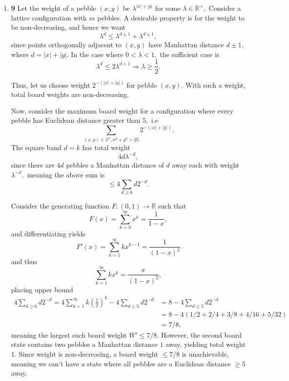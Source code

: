 \documentclass[12pt]{article}
\begin{document}
\begin{enumerate}
    Reversing this process will allow us to produce any arbitrary
    board configuration where all axis parallel rectangles have
    corner product $1$ starting from the board with all $1$'s.

  \item \textbf{9} Let the weight of a pebble $(x, y)$ be
    $\lambda^{|x| + |y|}$ for some $\lambda \in \mathbb R^{+},$
    Consider a lattice configuration with $m$ pebbles. A desirable
    property is for the weight to be non-decreasing, and hence we want
    $$
    \lambda^{d} \leq \lambda^{d \pm 1} + \lambda^{ d \pm 1},
    $$
    since points orthogonally adjacent to $(x, y)$ have Manhattan
    distance $d \pm 1,$ where $d = |x| + |y|.$ In the case where $0 <
    \lambda < 1,$ the sufficient case is
    $$
    \lambda^d \leq 2 \lambda ^{d+1} \Rightarrow \lambda \geq  \frac{1}{2}.
    $$

    Thus, let us choose weight $2^{-(|x| + |y|)}$ for pebble $(x,
    y).$ With such a weight, total board weights are non-decreasing.

    Now, consider the maximum board weight for a configuration where
    every pebble has Euclidean distance greater than $5,$ i.e
    $$
    \sum_{(x, y) \in \mathbb Z^{2}, x^2 + y^2 > 25} 2^{-(|x| + |y|)}.
    $$
    The square band $d = k$ has total weight
    $$
    4d\lambda^{-d} ,
    $$
    since there are $4d$ pebbles a Manhattan distance of $d$ away
    each with weight $\lambda^{-d},$ meaning the above sum is
    $$
    \leq 4\sum_{d \geq 6} d 2^{-d}.
    $$

    Consider the generating function $F : (0, 1) \to \mathbb R$ such that $$
    F(x) = \sum_{k = 0}^{\infty} x^{k} = \dfrac{1}{1-x},
    $$
    and differentiating yields
    $$
    F'(x)  = \sum_{k = 1}^{\infty} kx^{k-1} = \dfrac{1}{(1-x)^2}
    $$
    and thus
    $$
    \sum_{k = 1}^{\infty} kx^{k} = \dfrac{x}{(1-x)^2},
    $$
    placing upper bound
    \begin{align*}
      4\sum_{d \geq 6} d2^{-d} = 4\sum_{k = 1}^{\infty}
      k\left(\frac{1}{2}\right)^{k} - 4\sum_{d \leq 5} d2^{-d} &= 8 -
      4\sum_{d \leq 5} d2^{-d} \\
      &= 8 - 4(1/2 + 2/4 + 3/8 + 4/16 + 5/32) \\
      &= 7/8,
    \end{align*}
    meaning the largest such board weight $W' \leq 7/8.$ However, the
    second board state contains two pebbles a Manhattan distance $1$
    away, yielding total weight $1.$ Since weight is non-decreasing,
    a board weight $\leq 7/8$ is unachievable, meaning we can't have
    a state where all pebbles are a Euclidean distance $\geq 5$ away.


\end{enumerate}
\end{document}

